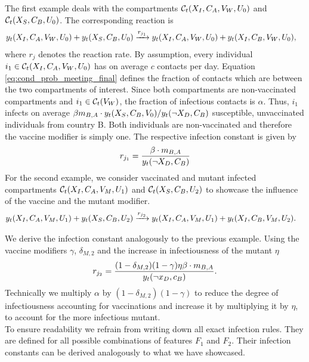 The first example deals with the compartments $\mathcal{C}_t(X_{I}, C_A, V_W, U_0)$ and $\mathcal{C}_t(X_{S}, C_B, U_0)$. The corresponding reaction is
\begin{align}
y_t(X_{I}, C_A, V_W, U_0) + y_t(X_{S}, C_B, U_0) &\xrightarrow{ r_{j_1}} y_t(X_{I}, C_A, V_W, U_0) + y_t(X_{I}, C_B, V_W, U_0),
\end{align}
where $r_j$ denotes the reaction rate.
By assumption, every individual $i_1 \in \mathcal{C}_t(X_{I}, C_A, V_W, U_0)$ has on average $c$ contacts per day. Equation \eqref{eq:cond_prob_meeting_final} defines the fraction of contacts which are between the two compartments of interest. Since both compartments are non-vaccinated compartments and $i_1 \in \mathcal{C}_t(V_W)$, the fraction of infectious contacts is $\alpha$. Thus, $i_1$ infects on average $\beta m_{B,A} \cdot y_t(X_S, C_B, V_0) / y_t(\neg X_D, C_B)$ susceptible, unvaccinated individuals from country B. Both individuals are non-vaccinated and therefore the vaccine modifier is simply one. The respective infection constant is given by
\begin{align}
r_{j_1} = \frac{\beta \cdot m_{B,A} }{ y_t(\neg X_D, C_B) } 
\end{align}
For the second example, we consider vaccinated and mutant infected compartments $\mathcal{C}_t(X_{I}, C_A, V_M, U_1)$ and $\mathcal{C}_t(X_{S}, C_B, U_2)$ to showcase the influence of the vaccine and the mutant modifier. 
\begin{align}
y_t(X_{I}, C_A, V_M, U_1) + y_t(X_{S}, C_B, U_2) &\xrightarrow{ r_{j_2}} y_t(X_{I}, C_A, V_M, U_1) + y_t(X_{I}, C_B, V_M, U_2).
\end{align}

We derive the infection constant analogously to the previous example. Using the vaccine modifiers $\gamma$, $\delta_{M, 2}$ and the increase in infectiousness of the mutant $\eta$ 
\begin{align}
r_{j_2} = \frac{(1-\delta_{M,2}) (1-\gamma) \eta \beta \cdot m_{B,A} }{ y_t(\neg x_D, c_B) }.
\end{align}
Technically we multiply $\alpha$ by $(1-\delta_{M,2}) (1-\gamma)$ to reduce the degree of infectiousness accounting for vaccinations and increase it by multiplying it by $\eta$, to account for the more infectious mutant.\\

To ensure readability we refrain from writing down all exact infection rules. They are defined for all possible combinations of features $F_1$ and $F_2$. Their infection constants can be derived analogously to what we have showcased.

